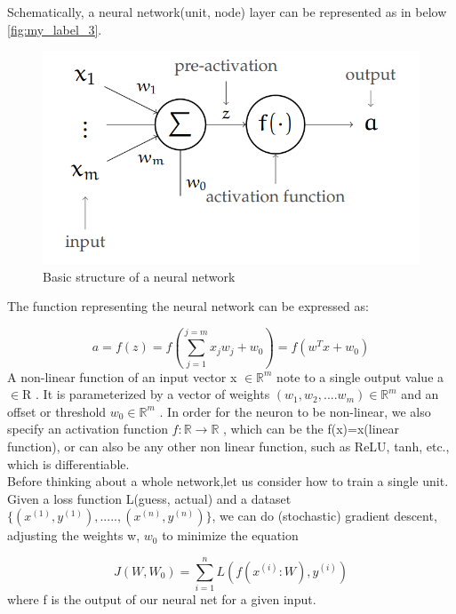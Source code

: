 Schematically, a neural network(unit, node) layer can be represented as in below \autoref{fig:my_label_3}. 
\begin{figure}[H]
    \centering
    \includegraphics[scale =0.5]{Figures/ml__1.png}
    \caption{Basic structure of a neural network}
    \label{fig:my_label_3}
\end{figure}




The function representing the neural network can be expressed as:

\begin{equation}\label{eq:eq1}
a= f(z) = f(\sum_{j=1}^{j=m} x_jw_j +w_0) = f(w^T x+w_0)
\end{equation}
A non-linear function of an input vector x $\in \mathbb{R}^m$ note to a single output value  a $\in$R . It is parameterized by a vector of weights  $(w_1, w_2,....w_m)\in \mathbb{R}^m$  and an offset or threshold  $w_0\in \mathbb{R}^m$ . In order for the neuron to be non-linear, we also specify an activation function  $f:\mathbb{R} \to \mathbb{R}$ , which can be the f(x)=x(linear function), or can also be any other non linear function, such as ReLU, tanh, etc., which is differentiable. 
\\
Before thinking about a whole network,let us consider how to train a single unit. \\
Given a loss function L(guess, actual) and a dataset $\{(x^{(1)},y^{(1)}),.....,(x^{(n)},y^{(n)})\}$, we can do (stochastic) gradient descent, adjusting the weights w, $w_0$ to minimize the equation 

\begin{equation} \label{eq:eq2}
    J(W, W_0) = \sum_{i=1} ^n L(f(x^{(i)}:W),y^{(i)})
\end{equation}
where f is the output of our neural net for a given input.

